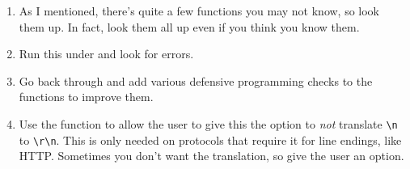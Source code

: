 \begin{enumerate}
\item As I mentioned, there's quite a few functions you may not know, so
    look them up.  In fact, look them all up even if you think you know
    them.
\item Run this under  and look for errors.
\item Go back through and add various defensive programming checks to
    the functions to improve them.
\item Use the  function to allow the user to give this
    the option to \emph{not} translate \verb|\n| to \verb|\r\n|. This
    is only needed on protocols that require it for line endings, like HTTP.
    Sometimes you don't want the translation, so give the user an option.
\end{enumerate}
